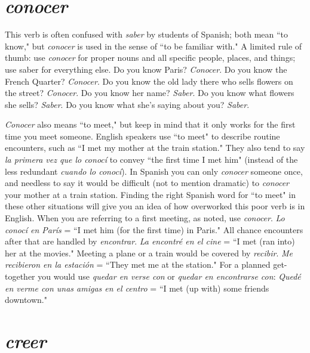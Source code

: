 \section{\emph{conocer}}

This verb is often confused with \emph{saber} by students of Spanish;
both mean ``to know," but \emph{conocer} is used in the sense of ``to be familiar with." A limited rule of thumb: use \emph{conocer} for proper nouns and
all specific people, places, and things; use saber for everything else. Do
you know Paris? \emph{Conocer}. Do you know the French Quarter? \emph{Conocer}.
Do you know the old lady there who sells flowers on the street? \emph{Conocer}. Do you know her name? \emph{Saber}. Do you know what flowers she
sells? \emph{Saber}. Do you know what she's saying about you? \emph{Saber}.

\emph{Conocer} also means ``to meet," but keep in mind that it only
works for the first time you meet someone. English speakers use ``to
meet" to describe routine encounters, such as ``I met my mother at
the train station." They also tend to say \emph{la primera vez que lo conocí}
to convey ``the first time I met him" (instead of the less redundant
\emph{cuando lo conocí}). In Spanish you can only \emph{conocer} someone once, and
needless to say it would be difficult (not to mention dramatic) to \emph{conocer} your mother at a train station. Finding the right Spanish word for
``to meet" in these other situations will give you an idea of how overworked this poor verb is in English. When you are referring to a first
meeting, as noted, use \emph{conocer}. \emph{Lo conocí en París} = ``I met him (for
the first time) in Paris." All chance encounters after that are handled
by \emph{encontrar}. \emph{La encontré en el cine} = ``I met (ran into) her at the
movies." Meeting a plane or a train would be covered by \emph{recibir}. \emph{Me
	recibieron en la estación} = ``They met me at the station." For a
planned get-together you would use \emph{quedar en verse con} or \emph{quedar en
	encontrarse con}: \emph{Quedé en verme con unas amigas en el centro} = ``I
met (up with) some friends downtown."

\section{\emph{creer}}

